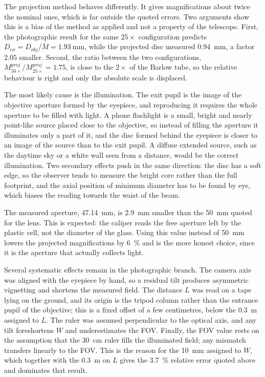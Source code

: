\documentclass[conference]{IEEEtran}
\begin{document}
The projection method behaves differently. It gives magnifications about twice
the nominal ones, which is far outside the quoted errors. Two arguments show
this is a bias of the method as applied and not a property of the telescope.
First, the photographic result for the same $25\times$ configuration
predicts $D_{ex} = D_{obj}/\bar{M} = \SI{1.93}{\milli\meter}$, while the
projected disc measured \SI{0.94}{\milli\meter}, a factor $2.05$ smaller.
Second, the ratio between the two configurations,
$M^{proj}_{50\times}/M^{proj}_{25\times} = 1.75$, is close to the
$2\times$ of the Barlow tube, so the relative behaviour is right and only
the absolute scale is displaced.

The most likely cause is the illumination. The exit pupil is the image of the
objective aperture formed by the eyepiece, and reproducing it requires the
whole aperture to be filled with light. A phone flashlight is a small, bright
and nearly point-like source placed close to the objective, so instead of
filling the aperture it illuminates only a part of it, and the disc formed
behind the eyepiece is closer to an image of the source than to the exit pupil.
A diffuse extended source, such as the daytime sky or a white wall seen from a
distance, would be the correct illumination. Two secondary effects push in the
same direction: the disc has a soft edge, so the observer tends to measure the
bright core rather than the full footprint, and the axial position of minimum
diameter has to be found by eye, which biases the reading towards the waist of
the beam.

The measured aperture, \SI{47.14}{\milli\meter}, is \SI{2.9}{\milli\meter}
smaller than the \SI{50}{\milli\meter} quoted for the lens. This is expected:
the caliper reads the free aperture left by the plastic cell, not the diameter
of the glass. Using this value instead of \SI{50}{\milli\meter} lowers the
projected magnifications by \SI{6}{\percent} and is the more honest choice,
since it is the aperture that actually collects light.

Several systematic effects remain in the photographic branch. The camera axis
was aligned with the eyepiece by hand, so a residual tilt produces asymmetric
vignetting and shortens the measured field. The distance $L$ was read on a tape
lying on the ground, and its origin is the tripod column rather than the
entrance pupil of the objective; this is a fixed offset of a few centimetres,
below the \SI{0.3}{\meter} assigned to $L$. The ruler was assumed
perpendicular to the optical axis, and any tilt foreshortens $W$ and
underestimates the FOV. Finally, the FOV value rests on the assumption that the
\SI{30}{\centi\meter} ruler fills the illuminated field; any mismatch
transfers linearly to the FOV. This is the reason for the \SI{10}{\milli\meter}
assigned to $W$, which together with the \SI{0.3}{\meter} on $L$ gives the
\SI{3.7}{\percent} relative error quoted above and dominates that result.
\end{document}
